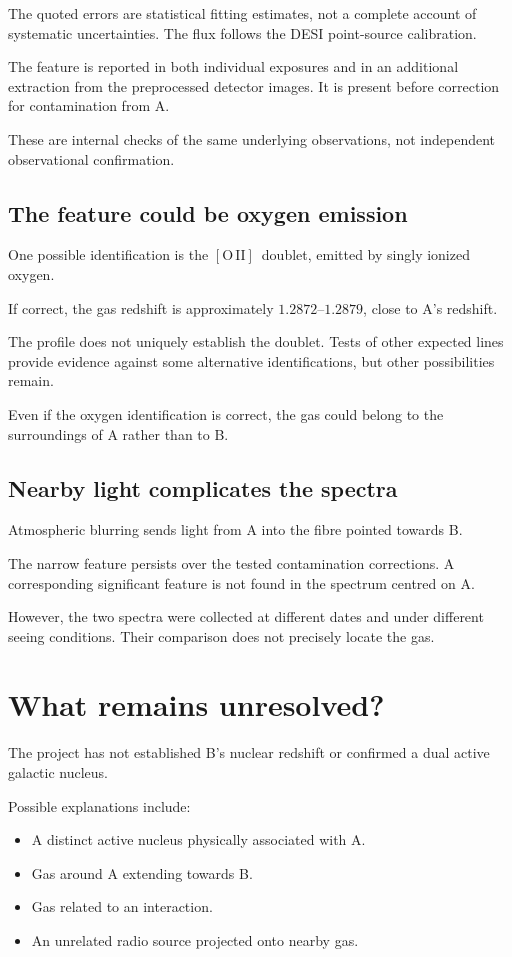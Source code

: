 \documentclass[11pt,a4paper]{article}
\newcommand{\OII}{\ensuremath{[\mathrm{O\,II}]}}
\begin{document}
The quoted errors are statistical fitting estimates, not a
complete account of systematic uncertainties. The flux follows
the DESI point-source calibration.

The feature is reported in both individual exposures and
in an additional extraction from the preprocessed detector
images. It is present before correction for contamination
from A.

These are internal checks of the same underlying observations,
not independent observational confirmation.

\subsection{The feature could be oxygen emission}

One possible identification is the \OII\ doublet, emitted
by singly ionized oxygen.

If correct, the gas redshift is approximately
\(1.2872\)--\(1.2879\), close to A's redshift.

The profile does not uniquely establish the doublet.
Tests of other expected lines provide evidence against
some alternative identifications, but other possibilities remain.

Even if the oxygen identification is correct, the gas could
belong to the surroundings of A rather than to B.

\subsection{Nearby light complicates the spectra}

Atmospheric blurring sends light from A into the fibre
pointed towards B.

The narrow feature persists over the tested contamination
corrections. A corresponding significant feature is not found
in the spectrum centred on A.

However, the two spectra were collected at different dates
and under different seeing conditions. Their comparison does
not precisely locate the gas.

\section{What remains unresolved?}

The project has not established B's nuclear redshift
or confirmed a dual active galactic nucleus.

Possible explanations include:
\begin{itemize}
    \item A distinct active nucleus physically associated with A.
    \item Gas around A extending towards B.
    \item Gas related to an interaction.
    \item An unrelated radio source projected onto nearby gas.
\end{itemize}
\end{document}
